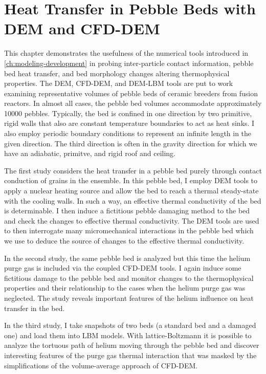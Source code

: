 \chapter{Heat Transfer in Pebble Beds with DEM and CFD-DEM}\label{sec:dem-studies}

This chapter demonstrates the usefulness of the numerical tools introduced in \cref{ch:modeling-development} in probing inter-particle contact information, pebble bed heat transfer, and bed morphology changes altering thermophysical properties. The DEM, CFD-DEM, and DEM-LBM tools are put to work examining representative volumes of pebble beds of ceramic breeders from fusion reactors. In almost all cases, the pebble bed volumes accommodate approximately \num{10000} pebbles. Typically, the bed is confined in one direction by two primitive, rigid walls that also are constant temperature boundaries to act as heat sinks. I also employ periodic boundary conditions to represent an infinite length in the given direction. The third direction is often in the gravity direction for which we have an adiabatic, primitve, and rigid roof and ceiling.

The first study considers the heat transfer in a pebble bed purely through contact conduction of grains in the ensemble. In this pebble bed, I employ DEM tools to apply a nuclear heating source and allow the bed to reach a thermal steady-state with the cooling walls. In such a way, an effective thermal conductivity of the bed is determinable. I then induce a fictitious pebble damaging method to the bed and check the changes to effective thermal conductivity. The DEM tools are used to then interrogate many micromechanical interactions in the pebble bed which we use to deduce the source of changes to the effective thermal conductivity.

In the second study, the same pebble bed is analyzed but this time the helium purge gas is included via the coupled CFD-DEM tools. I again induce some fictitious damage to the pebble bed and monitor changes to the thermophysical properties and their relationship to the cases when the helium purge gas was neglected. The study reveals important features of the helium influence on heat transfer in the bed.

In the third study, I take snapshots of two beds (a standard bed and a damaged one) and load them into LBM models. With lattice-Boltzmann it is possible to analyze the tortuous path of helium moving through the pebble bed and discover interesting features of the purge gas thermal interaction that was masked by the simplifications of the volume-average approach of CFD-DEM.



